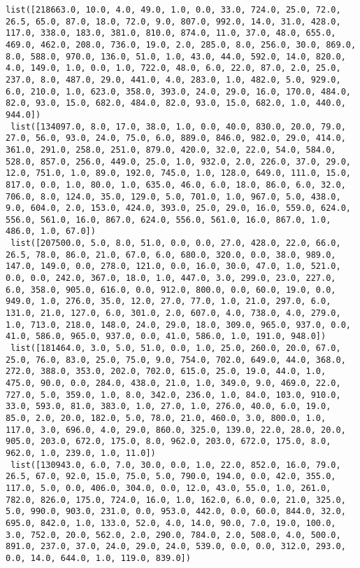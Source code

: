 \documentclass[11pt]{article}
\begin{document}
\begin{Verbatim}[commandchars=\\\{\}]
 list([218663.0, 10.0, 4.0, 49.0, 1.0, 0.0, 33.0, 724.0, 25.0, 72.0, 26.5, 65.0, 87.0, 18.0, 72.0, 9.0, 807.0, 992.0, 14.0, 31.0, 428.0, 117.0, 338.0, 183.0, 381.0, 810.0, 874.0, 11.0, 37.0, 48.0, 655.0, 469.0, 462.0, 208.0, 736.0, 19.0, 2.0, 285.0, 8.0, 256.0, 30.0, 869.0, 8.0, 588.0, 970.0, 136.0, 51.0, 1.0, 43.0, 44.0, 592.0, 14.0, 820.0, 4.0, 149.0, 1.0, 0.0, 1.0, 722.0, 48.0, 6.0, 22.0, 87.0, 2.0, 25.0, 237.0, 8.0, 487.0, 29.0, 441.0, 4.0, 283.0, 1.0, 482.0, 5.0, 929.0, 6.0, 210.0, 1.0, 623.0, 358.0, 393.0, 24.0, 29.0, 16.0, 170.0, 484.0, 82.0, 93.0, 15.0, 682.0, 484.0, 82.0, 93.0, 15.0, 682.0, 1.0, 440.0, 944.0])
 list([134097.0, 8.0, 17.0, 38.0, 1.0, 0.0, 40.0, 830.0, 20.0, 79.0, 27.0, 56.0, 93.0, 24.0, 75.0, 6.0, 889.0, 846.0, 982.0, 29.0, 414.0, 361.0, 291.0, 258.0, 251.0, 879.0, 420.0, 32.0, 22.0, 54.0, 584.0, 528.0, 857.0, 256.0, 449.0, 25.0, 1.0, 932.0, 2.0, 226.0, 37.0, 29.0, 12.0, 751.0, 1.0, 89.0, 192.0, 745.0, 1.0, 128.0, 649.0, 111.0, 15.0, 817.0, 0.0, 1.0, 80.0, 1.0, 635.0, 46.0, 6.0, 18.0, 86.0, 6.0, 32.0, 706.0, 8.0, 124.0, 35.0, 129.0, 5.0, 701.0, 1.0, 967.0, 5.0, 438.0, 9.0, 604.0, 2.0, 153.0, 424.0, 393.0, 25.0, 29.0, 16.0, 559.0, 624.0, 556.0, 561.0, 16.0, 867.0, 624.0, 556.0, 561.0, 16.0, 867.0, 1.0, 486.0, 1.0, 67.0])
 list([207500.0, 5.0, 8.0, 51.0, 0.0, 0.0, 27.0, 428.0, 22.0, 66.0, 26.5, 78.0, 86.0, 21.0, 67.0, 6.0, 680.0, 320.0, 0.0, 38.0, 989.0, 147.0, 149.0, 0.0, 278.0, 121.0, 0.0, 16.0, 30.0, 47.0, 1.0, 521.0, 0.0, 0.0, 242.0, 367.0, 18.0, 1.0, 447.0, 3.0, 299.0, 23.0, 227.0, 6.0, 358.0, 905.0, 616.0, 0.0, 912.0, 800.0, 0.0, 60.0, 19.0, 0.0, 949.0, 1.0, 276.0, 35.0, 12.0, 27.0, 77.0, 1.0, 21.0, 297.0, 6.0, 131.0, 21.0, 127.0, 6.0, 301.0, 2.0, 607.0, 4.0, 738.0, 4.0, 279.0, 1.0, 713.0, 218.0, 148.0, 24.0, 29.0, 18.0, 309.0, 965.0, 937.0, 0.0, 41.0, 586.0, 965.0, 937.0, 0.0, 41.0, 586.0, 1.0, 191.0, 948.0])
 list([181464.0, 3.0, 5.0, 51.0, 0.0, 1.0, 25.0, 260.0, 20.0, 67.0, 25.0, 76.0, 83.0, 25.0, 75.0, 9.0, 754.0, 702.0, 649.0, 44.0, 368.0, 272.0, 388.0, 353.0, 202.0, 702.0, 615.0, 25.0, 19.0, 44.0, 1.0, 475.0, 90.0, 0.0, 284.0, 438.0, 21.0, 1.0, 349.0, 9.0, 469.0, 22.0, 727.0, 5.0, 359.0, 1.0, 8.0, 342.0, 236.0, 1.0, 84.0, 103.0, 910.0, 33.0, 593.0, 81.0, 383.0, 1.0, 27.0, 1.0, 276.0, 40.0, 6.0, 19.0, 85.0, 2.0, 20.0, 182.0, 5.0, 78.0, 21.0, 460.0, 3.0, 800.0, 1.0, 117.0, 3.0, 696.0, 4.0, 29.0, 860.0, 325.0, 139.0, 22.0, 28.0, 20.0, 905.0, 203.0, 672.0, 175.0, 8.0, 962.0, 203.0, 672.0, 175.0, 8.0, 962.0, 1.0, 239.0, 1.0, 11.0])
 list([130943.0, 6.0, 7.0, 30.0, 0.0, 1.0, 22.0, 852.0, 16.0, 79.0, 26.5, 67.0, 92.0, 15.0, 75.0, 5.0, 790.0, 194.0, 0.0, 42.0, 355.0, 117.0, 5.0, 0.0, 406.0, 304.0, 0.0, 12.0, 43.0, 55.0, 1.0, 261.0, 782.0, 826.0, 175.0, 724.0, 16.0, 1.0, 162.0, 6.0, 0.0, 21.0, 325.0, 5.0, 990.0, 903.0, 231.0, 0.0, 953.0, 442.0, 0.0, 60.0, 844.0, 32.0, 695.0, 842.0, 1.0, 133.0, 52.0, 4.0, 14.0, 90.0, 7.0, 19.0, 100.0, 3.0, 752.0, 20.0, 562.0, 2.0, 290.0, 784.0, 2.0, 508.0, 4.0, 500.0, 891.0, 237.0, 37.0, 24.0, 29.0, 24.0, 539.0, 0.0, 0.0, 312.0, 293.0, 0.0, 14.0, 644.0, 1.0, 119.0, 839.0])

\end{Verbatim}
\end{document}
